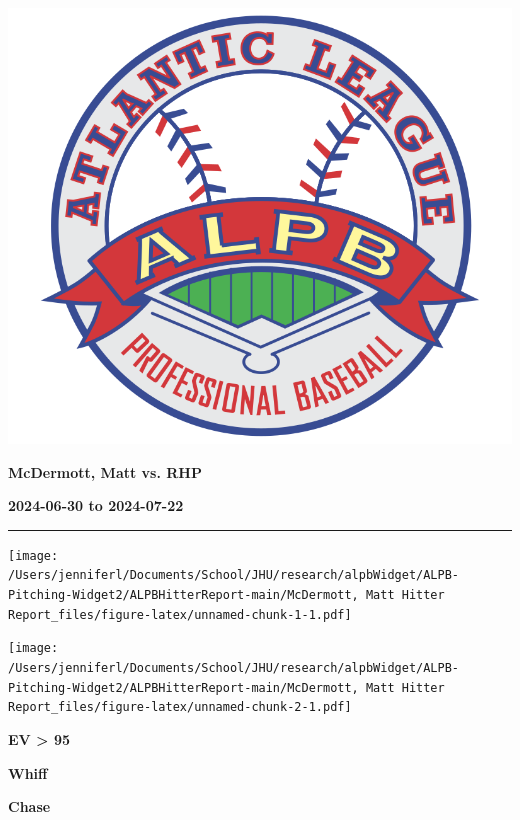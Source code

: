 \documentclass[
]{article}
\author{}
\date{\vspace{-2.5em}2025-02-16}
\begin{document}
\begin{multicols}{3} %

\includegraphics[width=0.4\columnwidth]{ALPB_Logo} %

\hspace{0pt}
\vfill
\hspace{-0.5in}\large\textbf{McDermott, Matt vs. RHP} %
\vfill
\hspace{0pt}

\hspace{0pt}
\vfill
\large\textbf{2024-06-30 to 2024-07-22} %
\vfill
\hspace{0pt}

\end{multicols}
\vspace{-0.35in}

\noindent

\rule{\textwidth}{0.75pt}

\texttt{[image: /Users/jenniferl/Documents/School/JHU/research/alpbWidget/ALPB-Pitching-Widget2/ALPBHitterReport-main/McDermott, Matt Hitter Report\_files/figure-latex/unnamed-chunk-1-1.pdf]}

\texttt{[image: /Users/jenniferl/Documents/School/JHU/research/alpbWidget/ALPB-Pitching-Widget2/ALPBHitterReport-main/McDermott, Matt Hitter Report\_files/figure-latex/unnamed-chunk-2-1.pdf]}

\begin{multicols}{3} %



\hspace{0.2in}\centerline{\LARGE\textbf{EV > 95}}



\hspace{-0.05in}\centerline{\LARGE\textbf{Whiff}}



\hspace{-0.05in}\centerline{\LARGE\textbf{Chase}}
\end{multicols}
\end{document}
